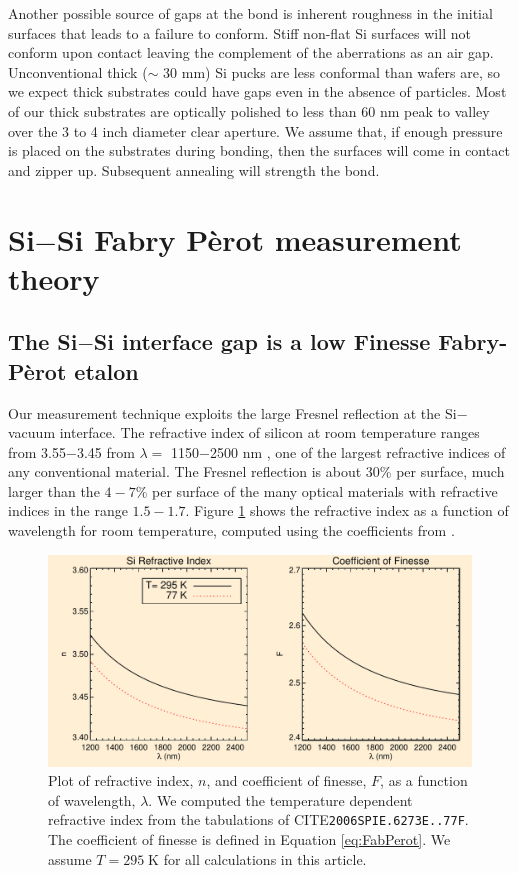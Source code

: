 \documentclass[osajnl,preprint,showpacs,superscriptaddress,12pt]{revtex4-1} %
\begin{document}
Another possible source of gaps at the bond is inherent roughness in the initial surfaces that leads to a failure to conform.  Stiff non-flat Si surfaces will not conform upon contact leaving the complement of the aberrations as an air gap. Unconventional thick ($\sim$ 30 mm) Si pucks are less conformal than wafers are, so we expect thick substrates could have gaps even in the absence of particles.  Most of our thick substrates are optically polished to less than 60 nm peak to valley over the 3 to 4 inch diameter clear aperture.  We assume that, if enough pressure is placed on the substrates during bonding, then the surfaces will come in contact and zipper up.  Subsequent annealing will strength the bond.

\section{Si$-$Si Fabry P\`{e}rot measurement theory}
\label{secTheory}

\subsection{The Si$-$Si interface gap is a low Finesse Fabry-P\`{e}rot etalon}

Our measurement technique exploits the large Fresnel reflection \cite{2001opt4.book.....H} at the Si$-$vacuum interface.  The refractive index of silicon at room temperature ranges from 3.55$-$3.45 from $\lambda = $ 1150$-$2500 nm \cite{2006SPIE.6273E..77F}, one of the largest refractive indices of any conventional material.  The Fresnel reflection is about 30\% per surface, much larger than the $4-7\%$ per surface of the many optical materials with refractive indices in the range $1.5-1.7$.  Figure \ref{figSiIndexFinesse} shows the refractive index as a function of wavelength for room temperature,  computed using the coefficients from \cite{2006SPIE.6273E..77F}.

\begin{figure}[htbp]
\centerline{\includegraphics[width=0.95\columnwidth]{figs/SiIndexAOmgsFinesseFig.pdf}}
\caption{Plot of refractive index, $n$, and coefficient of finesse, $F$, as a function of wavelength, $\lambda$.\label{figSiIndexFinesse} We computed the temperature dependent refractive index from the tabulations of CITE\texttt{2006SPIE.6273E..77F}.  The coefficient of finesse is defined in Equation \ref{eq:FabPerot}.  We assume $T= 295\;$K for all calculations in this article.}
\end{figure}
\end{document}
